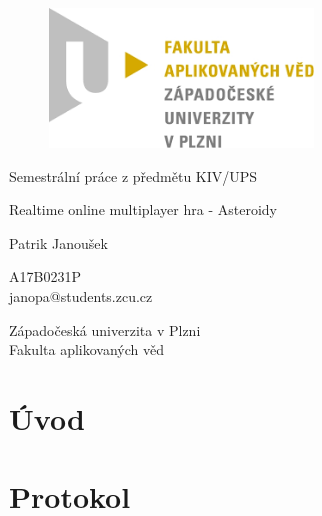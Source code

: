 \documentclass[12pt, a4paper]{article}
\begin{document}
    \begin{titlepage}

        \centering

        \vspace*{\baselineskip}

        \begin{figure}[H]
            \centering
            \includegraphics[width=7cm]{fav-logo.png}
        \end{figure}

        \vspace*{1\baselineskip}
        {\sc Semestrální práce z předmětu KIV/UPS}
        \vspace*{1\baselineskip}

        \vspace{0.75\baselineskip}

        {\LARGE\sc Realtime online multiplayer hra - Asteroidy \\}

        \vspace{4\baselineskip}

        {\sc\Large Patrik Janoušek \\}

        \vspace{0.5\baselineskip}

        {A17B0231P}\\
        {janopa@students.zcu.cz}

        \vfill

        {\sc Západočeská univerzita v Plzni\\
        Fakulta aplikovaných věd}


    \end{titlepage}


    \tableofcontents
    \pagebreak

    \newpage

    \section{Úvod}
    \section{Protokol}
\end{document}
